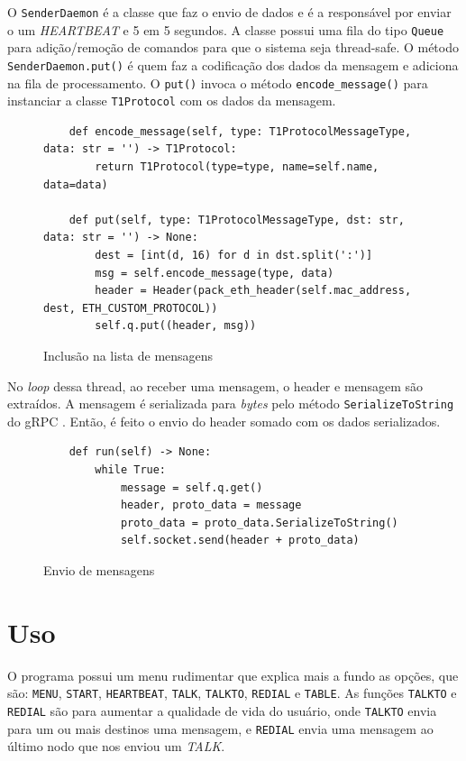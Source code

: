 O \lstinline{SenderDaemon} é a classe que faz o envio de dados e é a responsável por enviar o um \textit{HEARTBEAT} e 5 em 5 segundos.
A classe possui uma fila do tipo \lstinline{Queue} para adição/remoção de comandos para que o sistema seja thread-safe.
O método \lstinline{SenderDaemon.put()} é quem faz a codificação dos dados da mensagem e adiciona na fila de processamento.
O \lstinline{put()} invoca o método \lstinline{encode_message()} para instanciar a classe \lstinline{T1Protocol} com os dados
da mensagem.

\begin{figure}[H]
    \centering
\begin{verbatim}
    def encode_message(self, type: T1ProtocolMessageType, data: str = '') -> T1Protocol:
        return T1Protocol(type=type, name=self.name, data=data)

    def put(self, type: T1ProtocolMessageType, dst: str, data: str = '') -> None:
        dest = [int(d, 16) for d in dst.split(':')]
        msg = self.encode_message(type, data)
        header = Header(pack_eth_header(self.mac_address, dest, ETH_CUSTOM_PROTOCOL))
        self.q.put((header, msg))
\end{verbatim}
    \caption{Inclusão na lista de mensagens}
    \label{fig:encode_put}
\end{figure}

No \textit{loop} dessa thread, ao receber uma mensagem, o header e mensagem são extraídos.
A mensagem é serializada para \textit{bytes} pelo método \lstinline{SerializeToString} do gRPC \cite{grpc}.
Então, é feito o envio do header somado com os dados serializados.

\begin{figure}[H]
    \centering
\begin{verbatim}
    def run(self) -> None:
        while True:
            message = self.q.get()
            header, proto_data = message
            proto_data = proto_data.SerializeToString()
            self.socket.send(header + proto_data)
\end{verbatim}
    \caption{Envio de mensagens}
    \label{fig:run_send}
\end{figure}

\section{Uso}

O programa possui um menu rudimentar que explica mais a fundo as opções, que são: 
\lstinline{MENU}, \lstinline{START}, \lstinline{HEARTBEAT}, \lstinline{TALK}, \lstinline{TALKTO}, \lstinline{REDIAL} e \lstinline{TABLE}.
As funções \lstinline{TALKTO} e \lstinline{REDIAL} são para aumentar a qualidade de vida do usuário, onde \lstinline{TALKTO} envia
para um ou mais destinos uma mensagem, e \lstinline{REDIAL} envia uma mensagem ao último nodo que nos enviou um \textit{TALK}.

